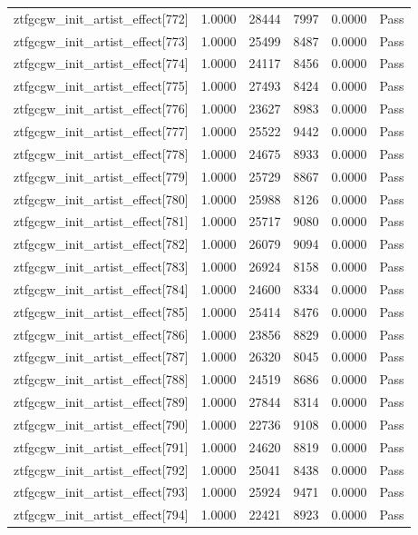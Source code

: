 \begin{table}[htbp]
\begin{tabular}{llrrll}
ztfgcgw\_init\_artist\_effect[772] & 1.0000 & 28444 & 7997 & 0.0000 & Pass \\
ztfgcgw\_init\_artist\_effect[773] & 1.0000 & 25499 & 8487 & 0.0000 & Pass \\
ztfgcgw\_init\_artist\_effect[774] & 1.0000 & 24117 & 8456 & 0.0000 & Pass \\
ztfgcgw\_init\_artist\_effect[775] & 1.0000 & 27493 & 8424 & 0.0000 & Pass \\
ztfgcgw\_init\_artist\_effect[776] & 1.0000 & 23627 & 8983 & 0.0000 & Pass \\
ztfgcgw\_init\_artist\_effect[777] & 1.0000 & 25522 & 9442 & 0.0000 & Pass \\
ztfgcgw\_init\_artist\_effect[778] & 1.0000 & 24675 & 8933 & 0.0000 & Pass \\
ztfgcgw\_init\_artist\_effect[779] & 1.0000 & 25729 & 8867 & 0.0000 & Pass \\
ztfgcgw\_init\_artist\_effect[780] & 1.0000 & 25988 & 8126 & 0.0000 & Pass \\
ztfgcgw\_init\_artist\_effect[781] & 1.0000 & 25717 & 9080 & 0.0000 & Pass \\
ztfgcgw\_init\_artist\_effect[782] & 1.0000 & 26079 & 9094 & 0.0000 & Pass \\
ztfgcgw\_init\_artist\_effect[783] & 1.0000 & 26924 & 8158 & 0.0000 & Pass \\
ztfgcgw\_init\_artist\_effect[784] & 1.0000 & 24600 & 8334 & 0.0000 & Pass \\
ztfgcgw\_init\_artist\_effect[785] & 1.0000 & 25414 & 8476 & 0.0000 & Pass \\
ztfgcgw\_init\_artist\_effect[786] & 1.0000 & 23856 & 8829 & 0.0000 & Pass \\
ztfgcgw\_init\_artist\_effect[787] & 1.0000 & 26320 & 8045 & 0.0000 & Pass \\
ztfgcgw\_init\_artist\_effect[788] & 1.0000 & 24519 & 8686 & 0.0000 & Pass \\
ztfgcgw\_init\_artist\_effect[789] & 1.0000 & 27844 & 8314 & 0.0000 & Pass \\
ztfgcgw\_init\_artist\_effect[790] & 1.0000 & 22736 & 9108 & 0.0000 & Pass \\
ztfgcgw\_init\_artist\_effect[791] & 1.0000 & 24620 & 8819 & 0.0000 & Pass \\
ztfgcgw\_init\_artist\_effect[792] & 1.0000 & 25041 & 8438 & 0.0000 & Pass \\
ztfgcgw\_init\_artist\_effect[793] & 1.0000 & 25924 & 9471 & 0.0000 & Pass \\
ztfgcgw\_init\_artist\_effect[794] & 1.0000 & 22421 & 8923 & 0.0000 & Pass \\

\end{tabular}
\end{table}
